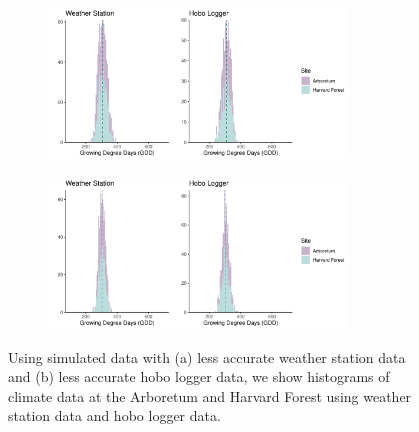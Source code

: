 \documentclass{article}\usepackage[]{graphicx}\usepackage[]{color}
\begin{document}
\begin{figure}[H]
  \begin{subfigure}{.5\textwidth}
    \caption{}
    \centering
    \includegraphics[height=4cm, width=8cm]{..//analyses/figures/gdd_methods_noisyws.pdf}
    \label{fig:gddnoisyws}
    \end{subfigure}
  \begin{subfigure}{.5\textwidth}
      \caption{}
      \centering
      \includegraphics[height=4cm, width=8cm]{..//analyses/figures/gdd_methods_noisyhobo.pdf}
    \label{fig:gddnoisyhobo}
    \end{subfigure}
\caption{ Using simulated data with (a) less accurate weather station data and (b) less accurate hobo logger data, we show histograms of climate data at the Arboretum and Harvard Forest using weather station data and hobo logger data.}
\label{fig:climhists}
\end{figure}
\end{document}
